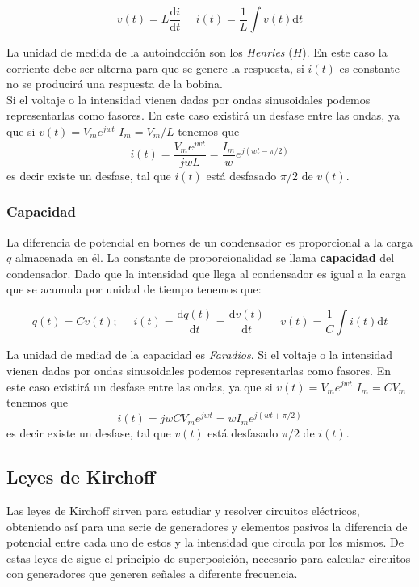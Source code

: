 \documentclass[12pt,a4paper]{article}
\newcommand{\D}{\mathrm{d}}
\begin{document}
\begin{equation}
v(t) = L \dfrac{\D i}{\D t} \ \ \ \ \ \ i(t) = \dfrac{1}{L} \int v(t) \D t
\end{equation}

La unidad de medida de la autoindcción son los \textit{Henries} ($H$). En este caso la corriente debe ser alterna para que se genere la respuesta, si $i(t)$ es constante no se producirá una respuesta de la bobina.  \\

Si el voltaje o la intensidad vienen dadas por ondas sinusoidales podemos representarlas como fasores. En este caso existirá un desfase entre las ondas, ya que si $v(t) = V_m e^{jwt}$ $I_m = V_m/L$ tenemos que $$i(t) = \dfrac{V_m e^{jwt}}{jwL} = \dfrac{I_m}{w} e^{j(wt-\pi/2)}$$ es decir existe un desfase, tal que $i(t)$ está desfasado $\pi/2$ de $v(t)$. 


\subsubsection{Capacidad}

La diferencia de potencial en bornes de un condensador es proporcional a la carga $q$ almacenada en él. La constante de proporcionalidad se llama \textbf{capacidad} del condensador. Dado que la intensidad que llega al condensador es igual a la carga que se acumula por unidad de tiempo tenemos que:

\begin{equation}
q(t) = C v(t); \ \ \ \ \ \ i(t) = \dfrac{\D  q(t)}{\D t} = \dfrac{\D v(t)}{\D t} \ \ \ \ \ \ v(t) = \dfrac{1}{C} \int i(t) \D t
\end{equation}

La unidad de mediad de la capacidad es \textit{Faradios}. Si el voltaje o la intensidad vienen dadas por ondas sinusoidales podemos representarlas como fasores. En este caso existirá un desfase entre las ondas, ya que si $v(t) = V_m e^{jwt}$ $I_m =C V_m$ tenemos que $$i(t) = jwCV_m e^{jwt} = w I_m e^{j(wt+\pi/2)}$$ es decir existe un desfase, tal que $v(t)$ está desfasado $\pi/2$ de $i(t)$.  



\subsection{Leyes de Kirchoff}

Las leyes de Kirchoff sirven para estudiar y resolver circuitos eléctricos, obteniendo así para una serie de generadores y elementos pasivos la diferencia de potencial entre cada uno de estos y la intensidad que circula por los mismos. De estas leyes de sigue el principio de superposición, necesario para calcular circuitos con generadores que generen señales a diferente frecuencia.
\end{document}
